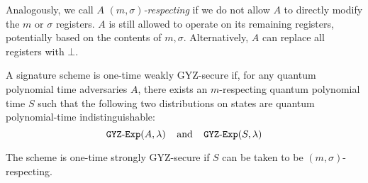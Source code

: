 Analogously, we call $A$ \emph{$(m,\sigma)$-respecting} if we do not allow $A$ to directly modify the $m$ or $\sigma$ registers.  $A$ is still allowed to operate on its remaining registers, potentially based on the contents of $m,\sigma$.  Alternatively, $A$ can replace all registers with $\bot$.

\begin{definition} A signature scheme is one-time weakly GYZ-secure if, for any quantum polynomial time adversaries $A$, there exists an $m$-respecting quantum polynomial time $S$ such that the following two distributions on states are quantum polynomial-time indistinguishable:
	\[{\tt{GYZ\text{-}Exp}}(A,\lambda)\;\;\;\;\text{and}\;\;\;\;{\tt{GYZ\text{-}Exp}}(S,\lambda)\]
	
\noindent The scheme is one-time strongly GYZ-secure if $S$ can be taken to be $(m,\sigma)$-respecting.  
\end{definition}


